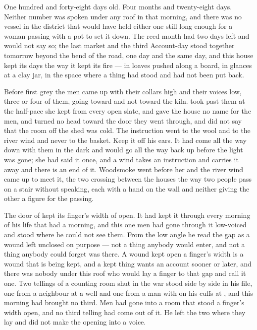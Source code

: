 
One hundred and forty-eight days old. Four months and twenty-eight days. Neither number was spoken under any roof in  that morning, and there was no vessel in the district that would have held either one still long enough for a woman passing with a pot to set it down. The reed month had two days left and would not say so; the last market and the third Account-day stood together tomorrow beyond the bend of the road, one day and the same day, and this house kept its days the way it kept its fire --- in loaves pushed along a board, in glances at a clay jar, in the space where a thing had stood and had not been put back.

Before first grey the men came up  with their collars high and their voices low, three or four of them, going toward  and not toward the kiln.  took  past them at the half-pace she kept from every open slate, and gave the house no name for the men, and turned no head toward the door they went through, and did not say that the room off the shed was cold. The instruction went to the wool and to the river wind and never to the basket. Keep it off his ears. It had come all the way down with them in the dark and would go all the way back up before the light was gone; she had said it once, and a wind takes an instruction and carries it away and there is an end of it. Woodsmoke went before her and the river wind came up to meet it, the two crossing between the houses the way two people pass on a stair without speaking, each with a hand on the wall and neither giving the other a figure for the passing.

The door of  kept its finger's width of open. It had kept it through every morning of his life that had a morning, and this one men had gone through it low-voiced and stood where he could not see them. From the low angle he read the gap as a wound left unclosed on purpose --- not a thing anybody would enter, and not a thing anybody could forget was there. A wound kept open a finger's width is a wound that is being kept, and a kept thing wants an account sooner or later, and there was nobody under this roof who would lay a finger to that gap and call it one. Two tellings of a counting room shut in the war stood side by side in his file, one from a neighbour at a well and one from a man with  on his cuffs at , and this morning had brought no third. Men had gone into a room that stood a finger's width open, and no third telling had come out of it. He left the two where they lay and did not make the opening into a voice.


